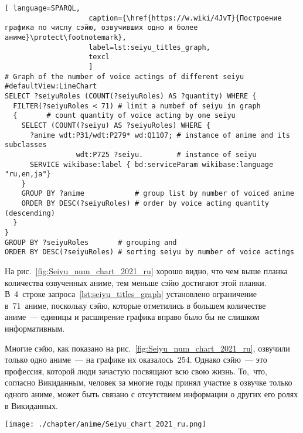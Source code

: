 \begin{lstlisting}[ language=SPARQL, 
                    caption={\href{https://w.wiki/4JvT}{Построение графика по числу сэйю, озвучивших одно и более аниме}\protect\footnotemark},
                    label=lst:seiyu_titles_graph,
                    texcl 
                    ]
# Graph of the number of voice actings of different seiyu
#defaultView:LineChart
SELECT ?seiyuRoles (COUNT(?seiyuRoles) AS ?quantity) WHERE {
  FILTER(?seiyuRoles < 71) # limit a numbef of seiyu in graph
  {       # count quantity of voice acting by one seiyu
    SELECT (COUNT(?seiyu) AS ?seiyuRoles) WHERE { 
      ?anime wdt:P31/wdt:P279* wd:Q1107; # instance of anime and its subclasses
                 wdt:P725 ?seiyu.        # instance of seiyu
      SERVICE wikibase:label { bd:serviceParam wikibase:language "ru,en,ja"}
    }
    GROUP BY ?anime            # group list by number of voiced anime
    ORDER BY DESC(?seiyuRoles) # order by voice acting quantity (descending)
  }
}
GROUP BY ?seiyuRoles       # grouping and
ORDER BY DESC(?seiyuRoles) # sorting seiyu by number of voice actings
\end{lstlisting}%


На рис.~\ref{fig:Seiyu_num_chart_2021_ru} хорошо видно, 
что чем выше планка количества озвученных аниме, 
тем меньше сэйю достигают этой планки. 
В~4~строке запроса~\ref{lst:seiyu_titles_graph} установлено ограничение в~71~аниме, 
поскольку сэйю, которые отметились в большем количестве аниме~--- единицы и расширение графика вправо было бы не слишком информативным.

Многие сэйю, как показано на рис.~\ref{fig:Seiyu_num_chart_2021_ru}, 
озвучили только одно аниме~--- на графике их оказалось~254. 
Однако сэйю~--- это профессия, которой люди зачастую посвящают всю свою жизнь. 
То,~что, согласно Викиданным, человек за многие годы принял участие в озвучке только одного аниме, 
может быть связано с отсутствием информации о других его ролях в Викиданных. 

\begin{figure*}[h]
    \texttt{[image: ./chapter/anime/Seiyu\_chart\_2021\_ru.png]}%
	\caption[График числа ролей, озвученных различными сэйю, 2021 год.]{График числа ролей, озвученных различными сэйю, 2021 год. График построен на~основе данных, полученных с~помощью запроса~\protect\ref{lst:seiyu_titles_graph}}%
    \label{fig:Seiyu_num_chart_2021_ru}%
\end{figure*} 





